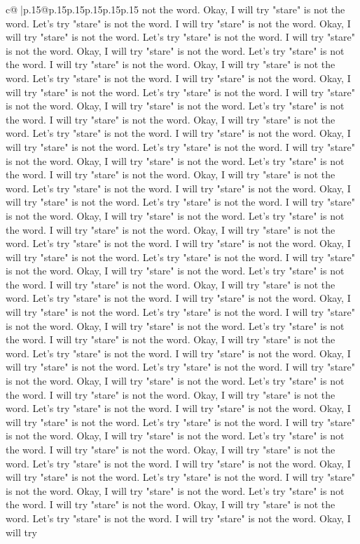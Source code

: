 \documentclass{article}
\begin{document}
{\begin{supertabular}{c@{$\;$}|p{.15\linewidth}@{}p{.15\linewidth}p{.15\linewidth}p{.15\linewidth}p{.15\linewidth}p{.15\linewidth}}
{{{not the word. Okay, I will try "stare" is not the word. Let's try "stare" is not the word. I will try "stare" is not the word. Okay, I will try "stare" is not the word. Let's try "stare" is not the word. I will try "stare" is not the word. Okay, I will try "stare" is not the word. Let's try "stare" is not the word. I will try "stare" is not the word. Okay, I will try "stare" is not the word. Let's try "stare" is not the word. I will try "stare" is not the word. Okay, I will try "stare" is not the word. Let's try "stare" is not the word. I will try "stare" is not the word. Okay, I will try "stare" is not the word. Let's try "stare" is not the word. I will try "stare" is not the word. Okay, I will try "stare" is not the word. Let's try "stare" is not the word. I will try "stare" is not the word. Okay, I will try "stare" is not the word. Let's try "stare" is not the word. I will try "stare" is not the word. Okay, I will try "stare" is not the word. Let's try "stare" is not the word. I will try "stare" is not the word. Okay, I will try "stare" is not the word. Let's try "stare" is not the word. I will try "stare" is not the word. Okay, I will try "stare" is not the word. Let's try "stare" is not the word. I will try "stare" is not the word. Okay, I will try "stare" is not the word. Let's try "stare" is not the word. I will try "stare" is not the word. Okay, I will try "stare" is not the word. Let's try "stare" is not the word. I will try "stare" is not the word. Okay, I will try "stare" is not the word. Let's try "stare" is not the word. I will try "stare" is not the word. Okay, I will try "stare" is not the word. Let's try "stare" is not the word. I will try "stare" is not the word. Okay, I will try "stare" is not the word. Let's try "stare" is not the word. I will try "stare" is not the word. Okay, I will try "stare" is not the word. Let's try "stare" is not the word. I will try "stare" is not the word. Okay, I will try "stare" is not the word. Let's try "stare" is not the word. I will try "stare" is not the word. Okay, I will try "stare" is not the word. Let's try "stare" is not the word. I will try "stare" is not the word. Okay, I will try "stare" is not the word. Let's try "stare" is not the word. I will try "stare" is not the word. Okay, I will try "stare" is not the word. Let's try "stare" is not the word. I will try "stare" is not the word. Okay, I will try "stare" is not the word. Let's try "stare" is not the word. I will try "stare" is not the word. Okay, I will try "stare" is not the word. Let's try "stare" is not the word. I will try "stare" is not the word. Okay, I will try "stare" is not the word. Let's try "stare" is not the word. I will try "stare" is not the word. Okay, I will try "stare" is not the word. Let's try "stare" is not the word. I will try "stare" is not the word. Okay, I will try "stare" is not the word. Let's try "stare" is not the word. I will try "stare" is not the word. Okay, I will try "stare" is not the word. Let's try "stare" is not the word. I will try "stare" is not the word. Okay, I will try "stare" is not the word. Let's try "stare" is not the word. I will try "stare" is not the word. Okay, I will try }}}
\end{supertabular}}
\end{document}
